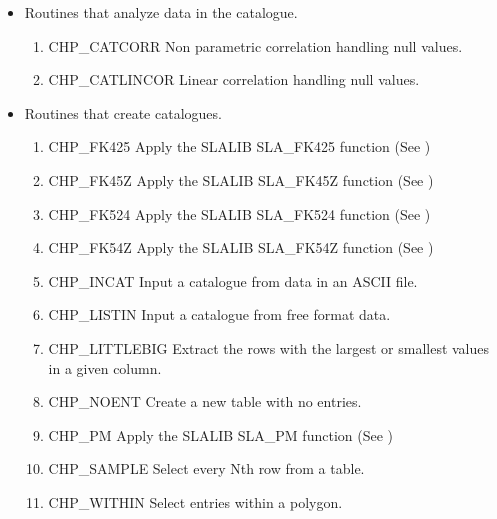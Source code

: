 \documentclass[11pt,nolof]{starlink}
\begin{document}
\begin{itemize}

\item Routines that analyze data in the catalogue.

 \begin{enumerate}

  \item CHP\_CATCORR Non parametric correlation handling null values.

  \item CHP\_CATLINCOR Linear correlation handling null values.

 \end{enumerate}

\item Routines that create catalogues.

 \begin{enumerate}

  \item CHP\_FK425 Apply the SLALIB SLA\_FK425 function (See )

  \item CHP\_FK45Z Apply the SLALIB SLA\_FK45Z function (See )

  \item CHP\_FK524 Apply the SLALIB SLA\_FK524 function (See )

  \item CHP\_FK54Z Apply the SLALIB SLA\_FK54Z function (See )

  \item CHP\_INCAT Input a catalogue from data in an ASCII file.

  \item CHP\_LISTIN Input a catalogue from free format data.

  \item CHP\_LITTLEBIG Extract the rows with the largest or smallest values in
a given column.

  \item CHP\_NOENT Create a new table with no entries.

  \item CHP\_PM Apply the SLALIB SLA\_PM function (See )

  \item CHP\_SAMPLE Select every Nth row from a table.

  \item CHP\_WITHIN Select entries within a polygon.


\end{enumerate}
\end{itemize}
\end{document}
